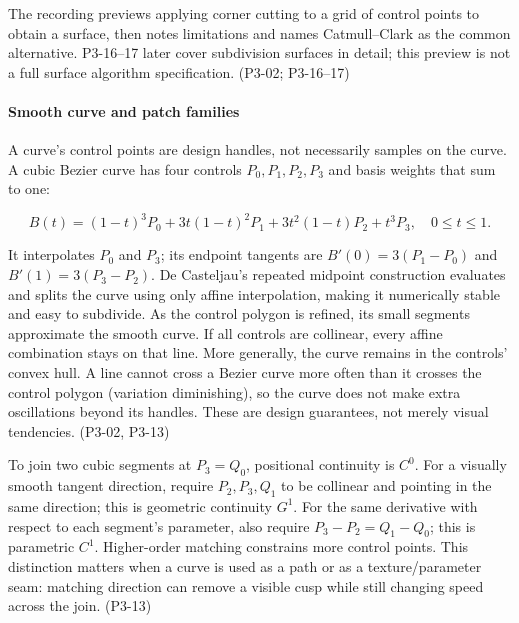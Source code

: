 The recording previews applying corner cutting to a grid of control points to obtain a surface, then notes limitations and names Catmull--Clark as the common alternative. P3-16--17 later cover subdivision surfaces in detail; this preview is not a full surface algorithm specification. (P3-02; P3-16--17)

\paragraph{Smooth curve and patch families}\label{03-visual-computing-i-ch001-smooth-curve-and-patch-families}

\hypertarget{03-visual-computing-i-ch001-smooth-curve-and-patch-families}{}

A curve's control points are design handles, not necessarily samples on the curve. A cubic Bezier curve has four controls \(P_0,P_1,P_2,P_3\) and basis weights that sum to one:

\[
B(t)=(1-t)^3P_0+3t(1-t)^2P_1+3t^2(1-t)P_2+t^3P_3,\quad 0\le t\le1.
\]

It interpolates \(P_0\) and \(P_3\); its endpoint tangents are \(B'(0)=3(P_1-P_0)\) and \(B'(1)=3(P_3-P_2)\). De Casteljau's repeated midpoint construction evaluates and splits the curve using only affine interpolation, making it numerically stable and easy to subdivide. As the control polygon is refined, its small segments approximate the smooth curve. If all controls are collinear, every affine combination stays on that line. More generally, the curve remains in the controls' convex hull. A line cannot cross a Bezier curve more often than it crosses the control polygon (variation diminishing), so the curve does not make extra oscillations beyond its handles. These are design guarantees, not merely visual tendencies. (P3-02, P3-13)

To join two cubic segments at \(P_3=Q_0\), positional continuity is \(C^0\). For a visually smooth tangent direction, require \(P_2,P_3,Q_1\) to be collinear and pointing in the same direction; this is geometric continuity \(G^1\). For the same derivative with respect to each segment's parameter, also require \(P_3-P_2=Q_1-Q_0\); this is parametric \(C^1\). Higher-order matching constrains more control points. This distinction matters when a curve is used as a path or as a texture/parameter seam: matching direction can remove a visible cusp while still changing speed across the join. (P3-13)

